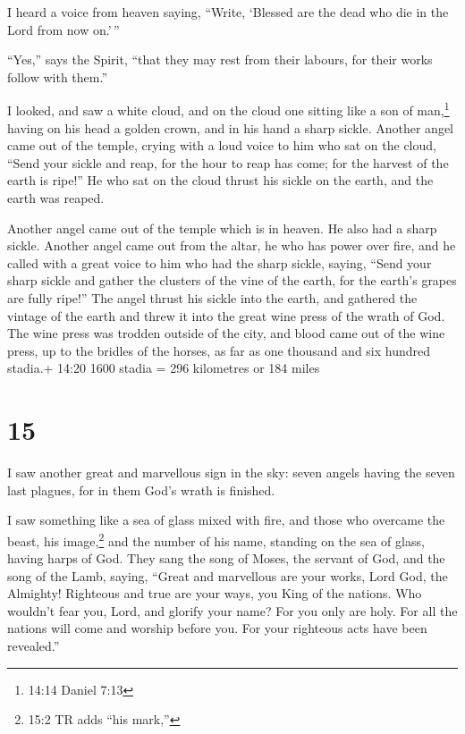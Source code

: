  I heard a voice from heaven saying, ``Write, `Blessed are
the dead who die in the Lord from now on.'\,''

``Yes,'' says the Spirit, ``that they may rest from their labours, for
their works follow with them.''

 I looked, and saw a white cloud, and on the cloud one
sitting like a son of man,\footnote{14:14 Daniel 7:13} having on his
head a golden crown, and in his hand a sharp sickle. 
Another angel came out of the temple, crying with a loud voice to him
who sat on the cloud, ``Send your sickle and reap, for the hour to reap
has come; for the harvest of the earth is ripe!''  He who
sat on the cloud thrust his sickle on the earth, and the earth was
reaped.

 Another angel came out of the temple which is in heaven.
He also had a sharp sickle.  Another angel came out from
the altar, he who has power over fire, and he called with a great voice
to him who had the sharp sickle, saying, ``Send your sharp sickle and
gather the clusters of the vine of the earth, for the earth's grapes are
fully ripe!''  The angel thrust his sickle into the earth,
and gathered the vintage of the earth and threw it into the great wine
press of the wrath of God.  The wine press was trodden
outside of the city, and blood came out of the wine press, up to the
bridles of the horses, as far as one thousand and six hundred stadia.+
14:20 1600 stadia = 296 kilometres or 184 miles

\hypertarget{section-14}{%
\section{15}\label{section-14}}

 I saw another great and marvellous sign in the sky: seven
angels having the seven last plagues, for in them God's wrath is
finished.

 I saw something like a sea of glass mixed with fire, and
those who overcame the beast, his image,\footnote{15:2 TR adds ``his
  mark,''} and the number of his name, standing on the sea of glass,
having harps of God.  They sang the song of Moses, the
servant of God, and the song of the Lamb, saying, ``Great and marvellous
are your works, Lord God, the Almighty! Righteous and true are your
ways, you King of the nations.  Who wouldn't fear you, Lord,
and glorify your name? For you only are holy. For all the nations will
come and worship before you. For your righteous acts have been
revealed.''

